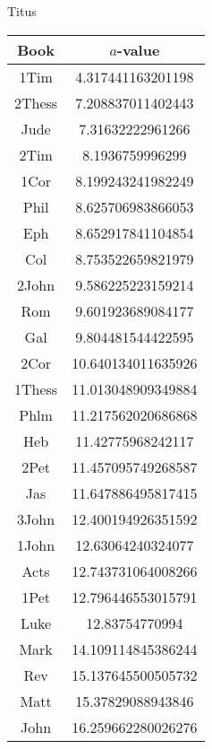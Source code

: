 \documentclass[12pt,letterpaper]{article}
\begin{document}
Titus
\begin{longtable}{|c|c|}
\hline
 Book & $a$-value \\ \hline
1Tim & 4.317441163201198 \\ \hline
 2Thess & 7.208837011402443 \\ \hline
 Jude & 7.31632222961266 \\ \hline
 2Tim & 8.1936759996299 \\ \hline
 1Cor & 8.199243241982249 \\ \hline
 Phil & 8.625706983866053 \\ \hline
 Eph & 8.652917841104854 \\ \hline
 Col & 8.753522659821979 \\ \hline
 2John & 9.586225223159214 \\ \hline
 Rom & 9.601923689084177 \\ \hline
 Gal & 9.804481544422595 \\ \hline
 2Cor & 10.640134011635926 \\ \hline
 1Thess & 11.013048909349884 \\ \hline
 Phlm & 11.217562020686868 \\ \hline
 Heb & 11.42775968242117 \\ \hline
 2Pet & 11.457095749268587 \\ \hline
 Jas & 11.647886495817415 \\ \hline
 3John & 12.400194926351592 \\ \hline
 1John & 12.63064240324077 \\ \hline
 Acts & 12.743731064008266 \\ \hline
 1Pet & 12.796446553015791 \\ \hline
 Luke & 12.83754770994 \\ \hline
 Mark & 14.109114845386244 \\ \hline
 Rev & 15.137645500505732 \\ \hline
 Matt & 15.37829088943846 \\ \hline
 John & 16.259662280026276 \\ \hline 
\end{longtable}
\end{document}
